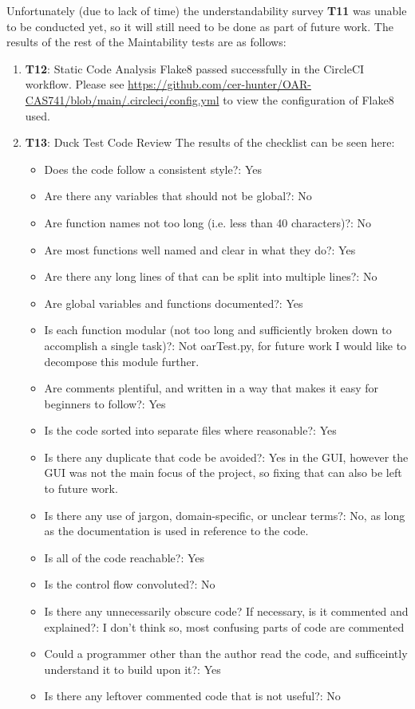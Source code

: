 \documentclass[12pt, titlepage]{article}
\begin{document}
Unfortunately (due to lack of time) the understandability survey \textbf{T11} was unable to be conducted yet, so it will still need to be done as part of future work.
The results of the rest of the Maintability tests are as follows:
\begin{enumerate}
  \item{\textbf{T12}: Static Code Analysis}
  Flake8 passed successfully in the CircleCI workflow. Please see \url{https://github.com/cer-hunter/OAR-CAS741/blob/main/.circleci/config.yml} to view the configuration of Flake8 used.
  \item{\textbf{T13}: Duck Test Code Review}
  The results of the checklist can be seen here:

  \begin{itemize}
    \item{Does the code follow a consistent style?: Yes}
    \item{Are there any variables that should not be global?: No}
    \item{Are function names not too long (i.e. less than 40 characters)?: No}
    \item{Are most functions well named and clear in what they do?: Yes}
    \item{Are there any long lines of that can be split into multiple lines?: No}
    \item{Are global variables and functions documented?: Yes}
    \item{Is each function modular (not too long and sufficiently broken down to accomplish a single task)?: Not oarTest.py, for future work I would like to decompose this module further.}
    \item{Are comments plentiful, and written in a way that makes it easy for beginners to follow?: Yes}
    \item{Is the code sorted into separate files where reasonable?: Yes}
    \item{Is there any duplicate that code be avoided?: Yes in the GUI, however the GUI was not the main focus of the project, so fixing that can also be left to future work.}
    \item{Is there any use of jargon, domain-specific, or unclear terms?: No, as long as the documentation is used in reference to the code.}
    \item{Is all of the code reachable?: Yes}
    \item{Is the control flow convoluted?: No}
    \item{Is there any unnecessarily obscure code? If necessary, is it commented and explained?: I don't think so, most confusing parts of code are commented}
    \item{Could a programmer other than the author read the code, and sufficeintly understand it to build upon it?: Yes}
    \item{Is there any leftover commented code that is not useful?: No}
  \end{itemize}

\end{enumerate}
\end{document}
